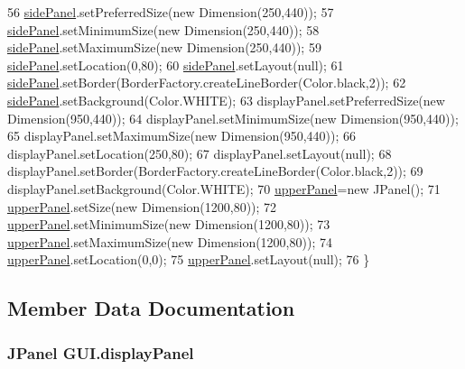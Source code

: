 \begin{DoxyCode}
56         \hyperlink{classGUI_a6930a3cfc244b0ce0d03e3fab60d33c7}{sidePanel}.setPreferredSize(\textcolor{keyword}{new} Dimension(250,440));
57         \hyperlink{classGUI_a6930a3cfc244b0ce0d03e3fab60d33c7}{sidePanel}.setMinimumSize(\textcolor{keyword}{new} Dimension(250,440));
58         \hyperlink{classGUI_a6930a3cfc244b0ce0d03e3fab60d33c7}{sidePanel}.setMaximumSize(\textcolor{keyword}{new} Dimension(250,440));
59         \hyperlink{classGUI_a6930a3cfc244b0ce0d03e3fab60d33c7}{sidePanel}.setLocation(0,80);
60         \hyperlink{classGUI_a6930a3cfc244b0ce0d03e3fab60d33c7}{sidePanel}.setLayout(null);
61         \hyperlink{classGUI_a6930a3cfc244b0ce0d03e3fab60d33c7}{sidePanel}.setBorder(BorderFactory.createLineBorder(Color.black,2));
62         \hyperlink{classGUI_a6930a3cfc244b0ce0d03e3fab60d33c7}{sidePanel}.setBackground(Color.WHITE);
63         displayPanel.setPreferredSize(\textcolor{keyword}{new} Dimension(950,440));
64         displayPanel.setMinimumSize(\textcolor{keyword}{new} Dimension(950,440));
65         displayPanel.setMaximumSize(\textcolor{keyword}{new} Dimension(950,440));
66         displayPanel.setLocation(250,80);
67         displayPanel.setLayout(null);
68         displayPanel.setBorder(BorderFactory.createLineBorder(Color.black,2));
69         displayPanel.setBackground(Color.WHITE);
70         \hyperlink{classGUI_a5ae695a244b7bf0e35c5387063d0a6ae}{upperPanel}=\textcolor{keyword}{new} JPanel();
71         \hyperlink{classGUI_a5ae695a244b7bf0e35c5387063d0a6ae}{upperPanel}.setSize(\textcolor{keyword}{new} Dimension(1200,80));
72         \hyperlink{classGUI_a5ae695a244b7bf0e35c5387063d0a6ae}{upperPanel}.setMinimumSize(\textcolor{keyword}{new} Dimension(1200,80));
73         \hyperlink{classGUI_a5ae695a244b7bf0e35c5387063d0a6ae}{upperPanel}.setMaximumSize(\textcolor{keyword}{new} Dimension(1200,80));
74         \hyperlink{classGUI_a5ae695a244b7bf0e35c5387063d0a6ae}{upperPanel}.setLocation(0,0);
75         \hyperlink{classGUI_a5ae695a244b7bf0e35c5387063d0a6ae}{upperPanel}.setLayout(null);
76     \}
\end{DoxyCode}


\subsection{Member Data Documentation}
\subsubsection[{\texorpdfstring{display\+Panel}{displayPanel}}]{\setlength{\rightskip}{0pt plus 5cm}J\+Panel G\+U\+I.\+display\+Panel\hspace{0.3cm}{\ttfamily [private]}}\hypertarget{classGUI_aa88e747a84e0e3b6ba35371f007c8151}{}\label{classGUI_aa88e747a84e0e3b6ba35371f007c8151}
